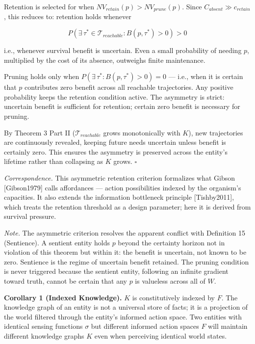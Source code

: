 \documentclass[
]{article}
\begin{document}
Retention is selected for when \(NV_{retain}(p) > NV_{prune}(p)\). Since
\(C_{absent} \gg
c_{retain}\), this reduces to: retention holds whenever

\[P\!\left(\exists\,\tau^* \in \mathcal{T}_{reachable} : B(p,\tau^*) > 0\right) > 0\]

i.e., whenever survival benefit is uncertain. Even a small probability
of needing \(p\), multiplied by the cost of its absence, outweighs
finite maintenance.

Pruning holds only when \(P(\exists\,\tau^* : B(p,\tau^*) > 0) = 0\) ---
i.e., when it is certain that \(p\) contributes zero benefit across all
reachable trajectories. Any positive probability keeps the retention
condition active. The asymmetry is strict: uncertain benefit is
sufficient for retention; certain zero benefit is necessary for pruning.

By Theorem 3 Part II (\(\mathcal{T}_{reachable}\) grows monotonically
with \(K\)), new trajectories are continuously revealed, keeping future
needs uncertain unless benefit is certainly zero. This ensures the
asymmetry is preserved across the entity's lifetime rather than
collapsing as \(K\) grows. \(\square\)

\emph{Correspondence.} This asymmetric retention criterion formalizes
what Gibson {[}Gibson1979{]} calls affordances --- action possibilities
indexed by the organism's capacities. It also extends the information
bottleneck principle {[}Tishby2011{]}, which treats the retention
threshold as a design parameter; here it is derived from survival
pressure.

\emph{Note.} The asymmetric criterion resolves the apparent conflict
with Definition 15 (Sentience). A sentient entity holds \(p\) beyond the
certainty horizon not in violation of this theorem but within it: the
benefit is uncertain, not known to be zero. Sentience is the regime of
uncertain benefit retained. The pruning condition is never triggered
because the sentient entity, following an infinite gradient toward
truth, cannot be certain that any \(p\) is valueless across all of
\(W\).

\textbf{Corollary 1 (Indexed Knowledge).} \(K\) is constitutively
indexed by \(F\). The knowledge graph of an entity is not a universal
store of facts; it is a projection of the world filtered through the
entity's informed action space. Two entities with identical sensing
functions \(\sigma\) but different informed action spaces \(F\) will
maintain different knowledge graphs \(K\) even when perceiving identical
world states.
\end{document}
